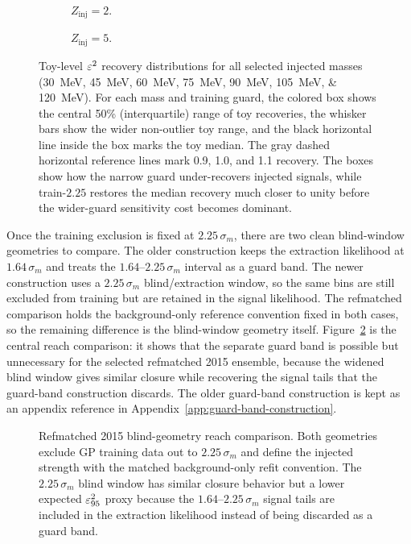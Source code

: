 \begin{figure}[H]
\centering
\begin{subfigure}[t]{0.98\linewidth}
  \centering
  \caption{$Z_{\mathrm{inj}}=2$.}
\end{subfigure}

\vspace{0.8em}

\begin{subfigure}[t]{0.98\linewidth}
  \centering
  \caption{$Z_{\mathrm{inj}}=5$.}
\end{subfigure}
\caption{Toy-level $\varepsilon^2$ recovery distributions for all selected injected masses
(\SIlist{30;45;60;75;90;105;120}{MeV}). For each mass and training guard, the colored
box shows the central 50\% (interquartile) range of toy recoveries, the whisker bars
show the wider non-outlier toy range, and the black horizontal line inside the box
marks the toy median. The gray dashed horizontal reference lines mark 0.9, 1.0, and
1.1 recovery. The boxes show how the
narrow guard under-recovers injected signals, while train-$2.25$ restores the median
recovery much closer to unity before the wider-guard sensitivity cost becomes
dominant.}
\label{fig:guard-band-recovery-boxes}
\end{figure}

Once the training exclusion is fixed at $2.25\,\sigma_m$, there are two clean
blind-window geometries to compare. The older construction keeps the extraction likelihood at $1.64\,\sigma_m$ and treats the $1.64$--$2.25\,\sigma_m$ interval as a guard band. The newer construction uses a $2.25\,\sigma_m$ blind/extraction window, so the same bins are still excluded from training but are retained in the signal likelihood. The refmatched comparison holds the background-only reference convention fixed in both cases, so the remaining difference is the blind-window geometry itself. Figure~\ref{fig:refmatched-blind-geometry-reach} is the central reach comparison: it shows that the separate guard band is possible but unnecessary for the selected refmatched 2015 ensemble, because the widened blind window gives similar closure while recovering the signal tails that the guard-band construction discards. The older guard-band construction is kept as an appendix reference in Appendix~\ref{app:guard-band-construction}.

\begin{figure}[h!]
\centering
{}
\caption{Refmatched 2015 blind-geometry reach comparison. Both geometries exclude GP training data out to $2.25\,\sigma_m$ and define the injected strength with the matched background-only refit convention. The $2.25\,\sigma_m$ blind window has similar closure behavior but a lower expected $\varepsilon^2_{95}$ proxy because the $1.64$--$2.25\,\sigma_m$ signal tails are included in the extraction likelihood instead of being discarded as a guard band.}
\label{fig:refmatched-blind-geometry-reach}
\end{figure}

